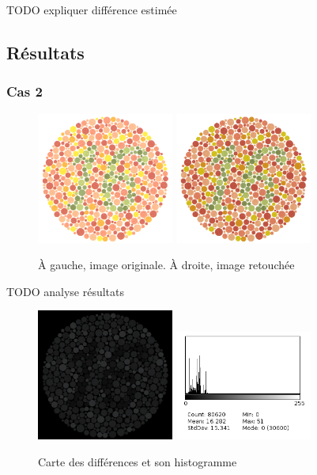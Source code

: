 \documentclass[a4paper]{article}
\begin{document}
TODO expliquer différence estimée

\clearpage
\subsection{Résultats}
\subsubsection{Cas 2}

\begin{figure}[H]
\begin{center}
\includegraphics[width=170px]{../base/cas_2_dalton16.png}
\includegraphics[width=170px]{../resultats/e2_q3_1_modif.png}
\end{center}
\caption{À gauche, image originale. À droite, image retouchée}
\end{figure}

TODO analyse résultats

\begin{figure}[H]
\begin{center}
\includegraphics[width=170px]{../resultats/e2_q3_1_diff.png}
\includegraphics[width=170px]{../resultats/e2_q3_1_diff_hist.png}
\end{center}
\caption{Carte des différences et son histogramme}
\end{figure}
\end{document}
